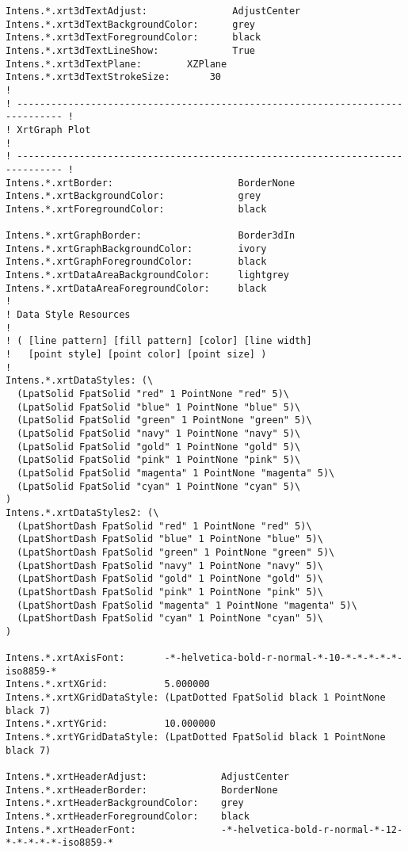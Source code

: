 {\begin{verbatim}
Intens.*.xrt3dTextAdjust:               AdjustCenter
Intens.*.xrt3dTextBackgroundColor:      grey
Intens.*.xrt3dTextForegroundColor:      black
Intens.*.xrt3dTextLineShow:             True
Intens.*.xrt3dTextPlane:		XZPlane
Intens.*.xrt3dTextStrokeSize:		30
!
! ------------------------------------------------------------------------------ !
! XrtGraph Plot                                                                  !
! ------------------------------------------------------------------------------ !
Intens.*.xrtBorder:                      BorderNone
Intens.*.xrtBackgroundColor:             grey
Intens.*.xrtForegroundColor:             black

Intens.*.xrtGraphBorder:                 Border3dIn
Intens.*.xrtGraphBackgroundColor:        ivory
Intens.*.xrtGraphForegroundColor:        black
Intens.*.xrtDataAreaBackgroundColor:     lightgrey
Intens.*.xrtDataAreaForegroundColor:     black
!
! Data Style Resources
!
! ( [line pattern] [fill pattern] [color] [line width]
!   [point style] [point color] [point size] )
!
Intens.*.xrtDataStyles: (\
  (LpatSolid FpatSolid "red" 1 PointNone "red" 5)\
  (LpatSolid FpatSolid "blue" 1 PointNone "blue" 5)\
  (LpatSolid FpatSolid "green" 1 PointNone "green" 5)\
  (LpatSolid FpatSolid "navy" 1 PointNone "navy" 5)\
  (LpatSolid FpatSolid "gold" 1 PointNone "gold" 5)\
  (LpatSolid FpatSolid "pink" 1 PointNone "pink" 5)\
  (LpatSolid FpatSolid "magenta" 1 PointNone "magenta" 5)\
  (LpatSolid FpatSolid "cyan" 1 PointNone "cyan" 5)\
)
Intens.*.xrtDataStyles2: (\
  (LpatShortDash FpatSolid "red" 1 PointNone "red" 5)\
  (LpatShortDash FpatSolid "blue" 1 PointNone "blue" 5)\
  (LpatShortDash FpatSolid "green" 1 PointNone "green" 5)\
  (LpatShortDash FpatSolid "navy" 1 PointNone "navy" 5)\
  (LpatShortDash FpatSolid "gold" 1 PointNone "gold" 5)\
  (LpatShortDash FpatSolid "pink" 1 PointNone "pink" 5)\
  (LpatShortDash FpatSolid "magenta" 1 PointNone "magenta" 5)\
  (LpatShortDash FpatSolid "cyan" 1 PointNone "cyan" 5)\
)

Intens.*.xrtAxisFont:       -*-helvetica-bold-r-normal-*-10-*-*-*-*-*-iso8859-*
Intens.*.xrtXGrid:          5.000000
Intens.*.xrtXGridDataStyle: (LpatDotted FpatSolid black 1 PointNone black 7)
Intens.*.xrtYGrid:          10.000000
Intens.*.xrtYGridDataStyle: (LpatDotted FpatSolid black 1 PointNone black 7)

Intens.*.xrtHeaderAdjust:             AdjustCenter
Intens.*.xrtHeaderBorder:             BorderNone
Intens.*.xrtHeaderBackgroundColor:    grey
Intens.*.xrtHeaderForegroundColor:    black
Intens.*.xrtHeaderFont:               -*-helvetica-bold-r-normal-*-12-*-*-*-*-*-iso8859-*


\end{verbatim}}
